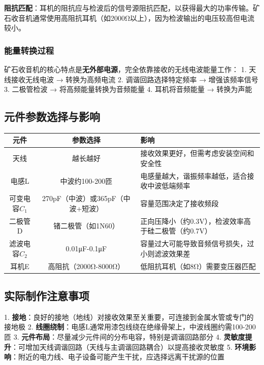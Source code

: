 \documentclass[12pt,UTF8]{ctexbook}
\begin{document}
\textbf{阻抗匹配}：耳机的阻抗应与检波后的信号源阻抗匹配，以获得最大的功率传输。矿石收音机通常使用高阻抗耳机（如2000Ω以上），因为检波输出的电压较高但电流较小。

\subsubsection{能量转换过程}

矿石收音机的核心特点是\textbf{无外部电源}，完全依靠接收的无线电波能量工作：
1. 天线接收无线电波 → 转换为高频电流
2. 调谐回路选择特定频率 → 增强该频率信号
3. 二极管检波 → 将高频能量转换为音频能量
4. 耳机将音频能量 → 转换为声能

\subsection{元件参数选择与影响}

\begin{center}
\begin{tabular}{|c|c|l|}
\hline
元件 & 参数选择 & 影响 \\
\hline
天线 & 越长越好 & 接收效果更好，但需考虑安装空间和安全性 \\
电感L & 中波约100-200匝 & 电感量越大，谐振频率越低，适合接收中波低端频率 \\
可变电容$C_1$ & 270pF（中波）或365pF（中波+短波） & 容量范围决定了接收频段 \\
二极管D & 锗二极管（如1N60） & 正向压降小（约0.3V），检波效率高于硅二极管（约0.7V） \\
滤波电容$C_2$ & 0.01μF-0.1μF & 容量过大可能导致音频信号损失，过小则滤波效果差 \\
耳机E & 高阻抗（2000Ω-8000Ω） & 低阻抗耳机（如8Ω）需要变压器匹配 \\
\hline
\end{tabular}
\end{center}

\subsection{实际制作注意事项}

1. \textbf{接地}：良好的接地（地线）对接收效果至关重要，可连接到金属水管或专门的接地极
2. \textbf{线圈绕制}：电感L通常用漆包线绕在绝缘骨架上，中波线圈约需100-200匝
3. \textbf{元件布局}：尽量减少元件间的分布电容，特别是调谐回路部分
4. \textbf{灵敏度提升}：可增加天线调谐回路（天线与主调谐回路耦合）以提高接收灵敏度
5. \textbf{环境影响}：附近的电力线、电子设备可能产生干扰，应选择远离干扰源的位置
\end{document}
